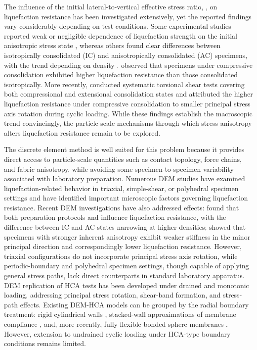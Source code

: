 \documentclass[../main]{subfiles}
\begin{document}
The influence of the initial lateral-to-vertical effective stress ratio, \Kzero{}, on liquefaction resistance has been investigated extensively, yet the reported findings vary considerably depending on test conditions. Some experimental studies reported weak or negligible dependence of liquefaction strength on the initial anisotropic stress state \citep[e.g.,][]{IshiharaTakatsu1979,YamashitaToki1993}, whereas others found clear differences between isotropically consolidated (IC) and anisotropically consolidated (AC) specimens, with the trend depending on density \citep{GeorgiannouKonstadinou2014}. \citet{Vargas2020} observed that specimens under compressive consolidation exhibited higher liquefaction resistance than those consolidated isotropically. More recently, \citet{Zhao2024} conducted systematic torsional shear tests covering both compressional and extensional consolidation states and attributed the higher liquefaction resistance under compressive consolidation to smaller principal stress axis rotation during cyclic loading. While these findings establish the macroscopic trend convincingly, the particle-scale mechanisms through which stress anisotropy alters liquefaction resistance remain to be explored.

The discrete element method \citep[DEM;][]{Cundall1979} is well suited for this problem because it provides direct access to particle-scale quantities such as contact topology, force chains, and fabric anisotropy, while avoiding some specimen-to-specimen variability associated with laboratory preparation. Numerous DEM studies have examined liquefaction-related behavior in triaxial, simple-shear, or polyhedral specimen settings \citep[e.g.,][]{Huang2018,Yang2021,Jiang2021,Morimoto2021,WuYang2022,Xie2023,YangHuang2023,Zhang2023} and have identified important microscopic factors governing liquefaction resistance. Recent DEM investigations have also addressed \Kzero{} effects: \citet{YangTaiebat2024} found that both preparation protocols and \Kzero{} influence liquefaction resistance, with the difference between IC and AC states narrowing at higher densities; \citet{Otsubo2022} showed that specimens with stronger inherent anisotropy exhibit weaker stiffness in the minor principal direction and correspondingly lower liquefaction resistance. However, triaxial configurations do not incorporate principal stress axis rotation, while periodic-boundary and polyhedral specimen settings, though capable of applying general stress paths, lack direct counterparts in standard laboratory apparatus. DEM replication of HCA tests has been developed under drained and monotonic loading, addressing principal stress rotation, shear-band formation, and stress-path effects. Existing DEM-HCA models can be grouped by the radial boundary treatment: rigid cylindrical walls \citep{Shi2021,Liu2021}, stacked-wall approximations of membrane compliance \citep{LiGuoZhang2014,LiZhangGutierrez2015,LiChenGutierrez2017}, and, more recently, fully flexible bonded-sphere membranes \citep{Song2024,Song2024suffusion}. However, extension to undrained cyclic loading under HCA-type boundary conditions remains limited.
\end{document}

